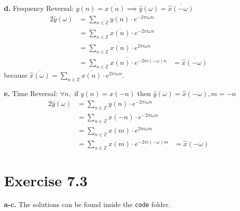 \documentclass[12pt]{article}
\newcommand{\inte}{\mathbb{Z}}
\newcommand{\een}{\ensuremath{e^{-2\pi i \omega n}}}
\begin{document}
	
	\textbf{d.} Frequency Reversal: $y(n) = \overline{x(n)} \implies \hat{y}(\omega) = \overline{\hat{x}(-\omega)}$
	\begin{alignat*}{2}
		\hat{y}(\omega) &= \sum_{n \in \inte} y(n) \cdot \een\\
		&= \sum_{n \in \inte} \overline{x(n)} \cdot \een\\
		&= \overline{\sum_{n \in \inte} x(n) \cdot e^{2\pi i \omega n}}\\
		&= \overline{\sum_{n \in \inte} x(n) \cdot e^{-2\pi i (-\omega) n}}
		&= \overline{\hat{x}(-\omega)}
	\end{alignat*}
	because $\overline{\hat{x}(\omega)} = \sum_{n \in \inte} \overline{x(n)} \cdot e^{2\pi i \omega n}$.
	
	
	\textbf{e.} Time Reversal: $ \forall n, \text{ if } y(n) = x(-n) \text{ then } \hat{y}(\omega) = \hat{x}(-\omega), m = -n$
	\begin{alignat*}{2}
		\hat{y}(\omega) &= \sum_{n \in \inte} y(n) \cdot \een\\
		&= \sum_{n \in \inte} x(-n) \cdot \een\\
		&= \sum_{n \in \inte} x(m) \cdot e^{2\pi i \omega m}\\
		&= \sum_{n \in \inte} x(m) \cdot e^{-2\pi i (-\omega) m}
		&= \hat{x}(-\omega)
	\end{alignat*}
	\section*{Exercise 7.3}
	\textbf{a-c.} The solutions can be found inside the \texttt{code} folder.
\end{document}

